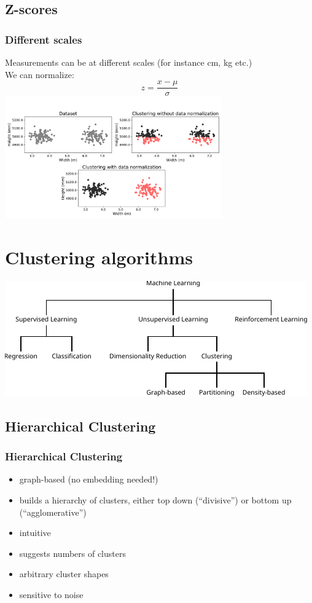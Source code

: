 \documentclass[Nike]{tuberlinbeamer}
\begin{document}
\subsection{Z-scores}
\begin{frame}
  \frametitle{Different scales}
  Measurements can be at different scales (for instance cm, kg etc.)\\
  We can normalize:
  \begin{equation*}
    z = \frac{x - \mu}{\sigma}
  \end{equation*}
  \pause
  \centering\includegraphics[width=0.7\textwidth]{normalization_clustering.png}
  \tiny \cite{guerin_clustering_2017}
\end{frame}


\section{Clustering algorithms}
\begin{frame}
  \vfill
  \centering\includegraphics[width=\textwidth]{ml_schema_ext}
  \vfill
\end{frame}

\subsection{Hierarchical Clustering}
\begin{frame}
  \frametitle{Hierarchical Clustering}
  \begin{itemize}[<+->]
    \item graph-based (no embedding needed!)
    \item builds a hierarchy of clusters, either top down (``divisive'') or bottom up (``agglomerative'')
    \item intuitive
    \item suggests numbers of clusters
    \item arbitrary cluster shapes
    \item sensitive to noise
  \end{itemize}
\end{frame}
\end{document}
